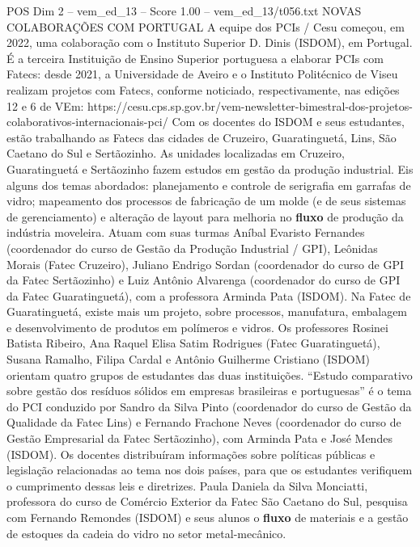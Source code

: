 \begin{textsample}{POS Dim 2 – vem\_ed\_13 – Score 1.00 – vem\_ed\_13/t056.txt}  \label{ex:f2_pos_015}
NOVAS COLABORAÇÕES COM PORTUGAL A equipe dos PCIs / Cesu começou, em 2022, uma colaboração com o Instituto Superior D.
Dinis (ISDOM), em Portugal.
É a terceira Instituição de Ensino Superior portuguesa a elaborar PCIs com Fatecs: desde 2021, a Universidade de Aveiro e o Instituto Politécnico de Viseu realizam projetos com Fatecs, conforme noticiado, respectivamente, nas edições 12 e 6 de VEm: https://cesu.cps.sp.gov.br/vem-newsletter-bimestral-dos-projetos-colaborativos-internacionais-pci/ Com os docentes do ISDOM e seus estudantes, estão trabalhando as Fatecs das cidades de Cruzeiro, Guaratinguetá, Lins, São Caetano do Sul e Sertãozinho.
As unidades localizadas em Cruzeiro, Guaratinguetá e Sertãozinho fazem estudos em gestão da produção industrial.
Eis alguns dos temas abordados: planejamento e controle de serigrafia em garrafas de vidro; mapeamento dos processos de fabricação de um molde (e de seus sistemas de gerenciamento) e alteração de layout para melhoria no \textbf{fluxo} de produção da indústria moveleira.
Atuam com suas turmas Aníbal Evaristo Fernandes (coordenador do curso de Gestão da Produção Industrial / GPI), Leônidas Morais (Fatec Cruzeiro), Juliano Endrigo Sordan (coordenador do curso de GPI da Fatec Sertãozinho) e Luiz Antônio Alvarenga (coordenador do curso de GPI da Fatec Guaratinguetá), com a professora Arminda Pata (ISDOM).
Na Fatec de Guaratinguetá, existe mais um projeto, sobre processos, manufatura, embalagem e desenvolvimento de produtos em polímeros e vidros.
Os professores Rosinei Batista Ribeiro, Ana Raquel Elisa Satim Rodrigues (Fatec Guaratinguetá), Susana Ramalho, Filipa Cardal e Antônio Guilherme Cristiano (ISDOM) orientam quatro grupos de estudantes das duas instituições. “Estudo comparativo sobre gestão dos resíduos sólidos em empresas brasileiras e portuguesas” é o tema do PCI conduzido por Sandro da Silva Pinto (coordenador do curso de Gestão da Qualidade da Fatec Lins) e Fernando Frachone Neves (coordenador do curso de Gestão Empresarial da Fatec Sertãozinho), com Arminda Pata e José Mendes (ISDOM).
Os docentes distribuíram informações sobre políticas públicas e legislação relacionadas ao tema nos dois países, para que os estudantes verifiquem o cumprimento dessas leis e diretrizes.
Paula Daniela da Silva Monciatti, professora do curso de Comércio Exterior da Fatec São Caetano do Sul, pesquisa com Fernando Remondes (ISDOM) e seus alunos o \textbf{fluxo} de materiais e a gestão de estoques da cadeia do vidro no setor metal-mecânico.

\end{textsample}
